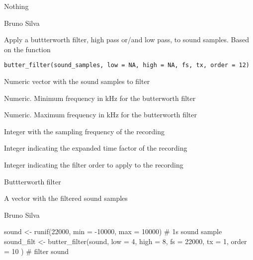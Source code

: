 \documentclass[letterpaper]{book}
\begin{document}
%
\begin{Value}
Nothing
\end{Value}
%
\begin{Author}\relax
Bruno Silva
\end{Author}
%
\begin{Description}\relax
Apply a buttterworth filter, high pass or/and low pass,
to sound samples. Based on the function 
\end{Description}
%
\begin{Usage}
\begin{verbatim}
butter_filter(sound_samples, low = NA, high = NA, fs, tx, order = 12)
\end{verbatim}
\end{Usage}
%
\begin{Arguments}
\begin{ldescription}
\item[\code{sound\_samples}] Numeric vector with the sound samples to filter

\item[\code{low}] Numeric. Minimum frequency in kHz for the butterworth filter

\item[\code{high}] Numeric. Maximum frequency in kHz for the butterworth filter

\item[\code{fs}] Integer with the sampling frequency of the recording

\item[\code{tx}] Integer indicating the expanded time factor of the recording

\item[\code{order}] Integer indicating the filter order to apply to the recording
\end{ldescription}
\end{Arguments}
%
\begin{Details}\relax
Buttterworth filter
\end{Details}
%
\begin{Value}
A vector with the filtered sound samples
\end{Value}
%
\begin{Author}\relax
Bruno Silva
\end{Author}
%
\begin{Examples}
\begin{ExampleCode}
sound <- runif(22000, min = -10000, max = 10000) # 1s sound sample
sound_filt <- butter_filter(sound,
  low = 4, high = 8,
  fs = 22000, tx = 1, order = 10
) # filter sound
\end{ExampleCode}
\end{Examples}
\end{document}
